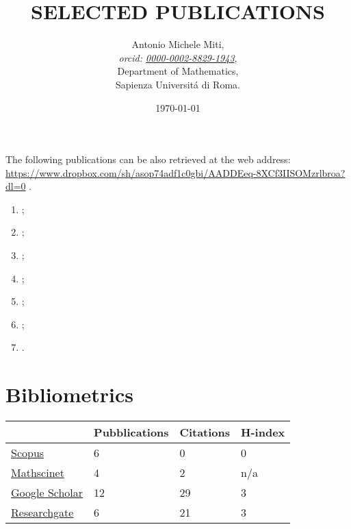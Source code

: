 \documentclass[a4paper]{article}
\title{SELECTED PUBLICATIONS}
\date{\today}
\author{
	Antonio Michele Miti,\\
	\emph{orcid: \href{https://orcid.org/0000-0002-8829-1943}{0000-0002-8829-1943}},
	\\
	Department of Mathematics,\\
	Sapienza Universit\'a di Roma.
}
\begin{document}
  

	\maketitle

	\noindent
  The following publications can be also retrieved at the web address:
  \\ 
  \url{https://www.dropbox.com/sh/asop74adf1c0gbi/AADDEeq-8XCf3IISOMzrlbroa?dl=0}
  .


	  \begin{enumerate}
		\item {};
    	\item {};
		\item {};	  
		\item {};		
 		\item {};
 		\item {};
 		\item {}.
	  \end{enumerate}

	\section*{Bibliometrics}

	\begin{center}
		\begin{tabularx}{.75\linewidth}{|X|p{7em}|p{7em}|p{7em}|}
				\hline
				 & 
				 Pubblications & 
				 Citations &
				 H-index 
				 \\
				 \hline 
				 \href{https://www.scopus.com/authid/detail.uri?authorId=57218509273\#tab=preprints}{Scopus} & 6 & 0 &0 
				 \\
				\href{https://mathscinet.ams.org/mathscinet/author?authorId=1435797}{Mathscinet} & 4 & 2 & n/a 
				\\
				\href{https://scholar.google.com/citations?user=DWKPuJYAAAAJ\&hl=it\&oi=ao}{Google Scholar} & 12 & 29 & 3 
				\\
				\href{https://www.researchgate.net/profile/Antonio-Miti}{Researchgate} & 6 & 21 & 3 
				\\
				\hline
		\end{tabularx}
	\end{center}
\end{document}
